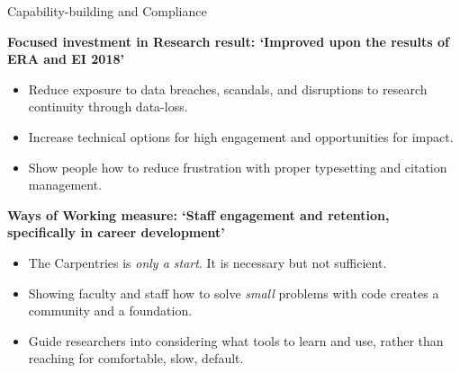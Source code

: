 \documentclass[aspectratio=1610, 11pt]{beamer} %
\begin{document}
\begin{frame}{Capability-building and Compliance}

\textbf{Focused investment in Research result: `Improved upon the results of ERA and EI 2018'}

\begin{itemize}
    \item Reduce exposure to data breaches,  scandals, and disruptions to research continuity through data-loss.
    \item Increase technical options for high engagement and opportunities for impact.
    \item Show people how to reduce frustration with proper typesetting and citation management.
\end{itemize}
\textbf{Ways of Working measure: `Staff engagement and retention, specifically in career development'}
\begin{itemize}
    \item The Carpentries is \textit{only a start}. It is necessary but not sufficient.
    \item Showing faculty and staff how to solve \textit{small} problems with code creates a community and a foundation.
    \item Guide researchers into considering what tools to learn and use, rather than reaching for comfortable, slow, default.
\end{itemize}
\end{frame}


\end{document}
